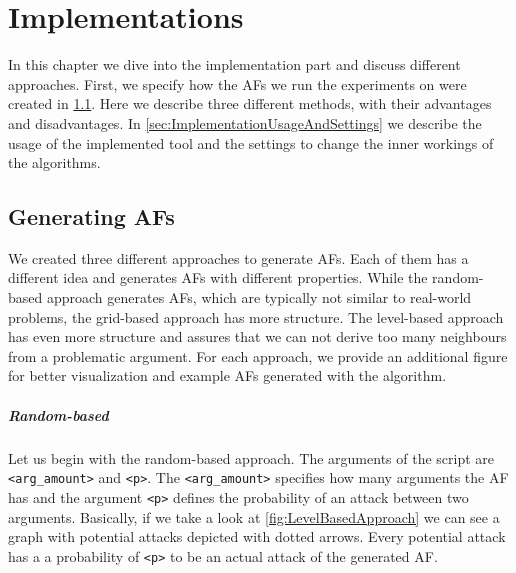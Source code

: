 \chapter{Implementations}
In this chapter we dive into the implementation part and discuss different approaches. First, we specify how the AFs we run the experiments on were created in \cref{sec:ImplementationsCreatingAFs}. Here we describe three different methods, with their advantages and disadvantages. In \cref{sec:ImplementationUsageAndSettings} we describe the usage of the implemented tool and the settings to change the inner workings of the algorithms.

\section{Generating AFs}
\label{sec:ImplementationsCreatingAFs}
We created three different approaches to generate AFs. Each of them has a different idea and generates AFs with different properties. While the random-based approach generates AFs, which are typically not similar to real-world problems, the grid-based approach has more structure. The level-based approach has even more structure and assures that we can not derive too many neighbours from a problematic argument. For each approach, we provide an additional figure for better visualization and example AFs generated with the algorithm.

\paragraph{Random-based} Let us begin with the random-based approach. The arguments of the script are \texttt{<arg\_amount>} and \texttt{<p>}. The \texttt{<arg\_amount>} specifies how many arguments the AF has and the argument \texttt{<p>} defines the probability of an attack between two arguments. Basically, if we take a look at \cref{fig:LevelBasedApproach} we can see a graph with potential attacks depicted with dotted arrows. Every potential attack has a a probability of \texttt{<p>} to be an actual attack of the generated AF.


